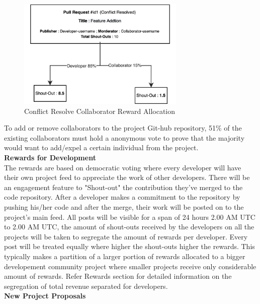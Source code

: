 \documentclass[letterpaper,11pt]{article}
\begin{document}
\begin{figure}[H]
\begin{center}
\includegraphics[width=8cm]{dev-reward-distribution}
\caption{Conflict Resolve Collaborator Reward Allocation}
\end{center}
\end{figure}

To add or remove collaborators to the project Git-hub repository, 51\% of the existing collaborators must hold a anonymous vote to prove that the majority would want to add/expel a certain individual from the project.\\
 
\textbf{Rewards for Development}\\

The rewards are based on democratic voting where every developer will have their own project feed to appreciate the work of other developers. There will be an engagement feature to "Shout-out" the contribution they've merged to the code repository. After a developer makes a commitment to the repository by pushing his/her code and after the merge, their work will be posted on to the project's main feed. All posts will be visible for a span of 24 hours 2.00 AM UTC to 2.00 AM UTC, the amount of shout-outs received by the developers on all the projects will be taken to segregate the amount of rewards per developer. Every post will be treated equally where higher the shout-outs higher the rewards. This typically makes a partition of a larger portion of rewards allocated to a bigger developement community project where smaller projects receive only considerable amount of rewards. Refer Rewards section for detailed information on the segregation of total revenue separated for developers.\\


\textbf{New Project Proposals}\\
\end{document}
